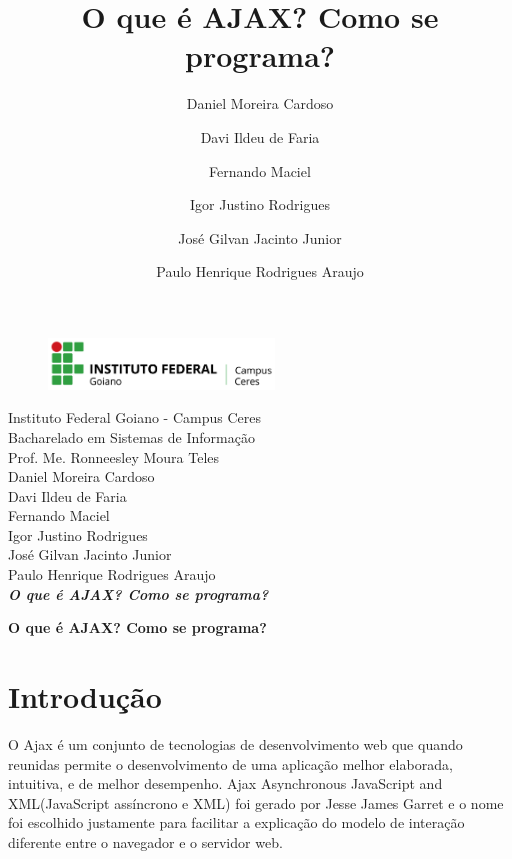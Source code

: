 \documentclass[12pt,a4paper]{article}
\title{O que é AJAX? Como se programa?}
\author{Daniel Moreira Cardoso \and Davi Ildeu de Faria \and Fernando Maciel \and Igor Justino Rodrigues \and José Gilvan Jacinto Junior \and Paulo Henrique Rodrigues Araujo}
\begin{document}
\begin{titlepage}
\begin{center}
\begin{figure}[htb]
                
                \label{figura:LogoIF}
        
                \centering
                \includegraphics[width=6cm]{recursos/imagens/logo.png} 
\end{figure}
Instituto Federal Goiano - Campus Ceres\\
Bacharelado em Sistemas de Informação\\
Prof. Me. Ronneesley Moura Teles\\\vspace{0.5cm}
Daniel Moreira Cardoso \\
Davi Ildeu de Faria \\
Fernando Maciel \\
Igor Justino Rodrigues \\
José Gilvan Jacinto Junior \\
Paulo Henrique Rodrigues Araujo \\
\vspace{5.0cm}
\textit{\textbf{\Large{O que é AJAX? Como se programa? }}}\\\vspace{0.5cm}
\vspace{9.5cm}
\end{center}
\end{titlepage}
\tableofcontents
\newpage
\begin{center}
\textbf{\Large{O que é AJAX? Como se programa?}}\\\vspace{0.5cm}
\end{center}
\section{Introdução}

O Ajax é um conjunto de tecnologias de desenvolvimento web que quando reunidas permite o desenvolvimento de uma aplicação melhor elaborada, intuitiva, e de melhor desempenho. Ajax Asynchronous JavaScript and XML(JavaScript assíncrono e XML) foi gerado por Jesse James Garret e o nome foi escolhido justamente para facilitar a explicação do modelo de interação diferente entre o navegador e o servidor web.
\end{document}
